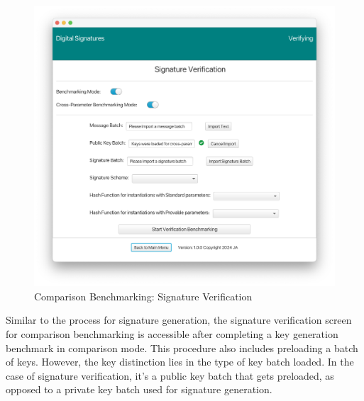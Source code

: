 \documentclass[]{final_report}
\theoremstyle{definition}
\begin{document}
\begin{figure}[H]
    \centering
    \includegraphics[scale= 0.4]{main_pictures/ui/verifying/verifying0.png}
    \caption{Comparison Benchmarking: Signature Verification}
\end{figure}

Similar to the process for signature generation, the signature verification screen for comparison benchmarking is accessible after completing a key generation benchmark in comparison mode. This procedure also includes preloading a batch of keys. However, the key distinction lies in the type of key batch loaded. In the case of signature verification, it's a public key batch that gets preloaded, as opposed to a private key batch used for signature generation.
\end{document}

